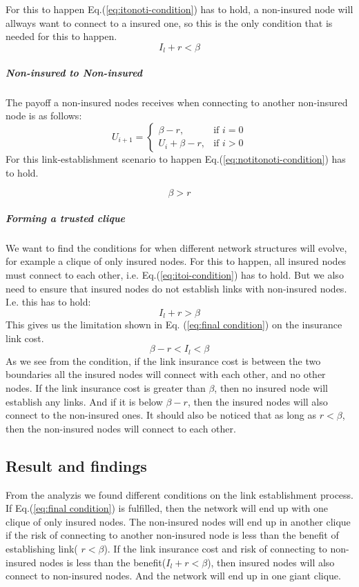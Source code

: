 For this to happen Eq.(\ref{eq:itonoti-condition}) has to hold, a non-insured node will allways want to connect to a insured one, so this is the only condition that is needed for this to happen.
\begin{equation}
I_{l}+r<\beta
\label{eq:itonoti-condition}
\end{equation}
\subparagraph{Non-insured to Non-insured}
The payoff a non-insured nodes receives when connecting to another non-insured node is as follows:
\begin{equation}
    U_{i+1}= 
\begin{cases}
    \beta -r,& \text{if } i = 0\\
    U_{i}+\beta -r,& \text{if }  i>0
   
\end{cases}
\label{eq:notitonotimodel2}
\end{equation}
For this link-establishment scenario to happen Eq.(\ref{eq:notitonoti-condition}) has to hold.

\begin{equation}
\beta>r
\label{eq:notitonoti-condition}
\end{equation}

\subparagraph{Forming a trusted clique}
We want to find the conditions for when different network structures will evolve, for example a clique of only insured nodes. For this to happen, all insured nodes must connect to each other, i.e. Eq.(\ref{eq:itoi-condition}) has to hold. But we also need to ensure that insured nodes do not establish links with non-insured nodes. I.e. this has to hold:
\begin{equation}
I_{l}+r>\beta
\end{equation}
This gives us the limitation shown in Eq. (\ref{eq:final condition}) on the insurance link cost.
\begin{equation}
\beta-r<I_{l}<\beta
\label{eq:final condition}
\end{equation}
As we see from the condition, if the link insurance cost is between the two boundaries all the insured nodes will connect with each other, and no other nodes. If the link insurance cost is greater than $\beta$, then no insured node will establish any links. And if it is below $\beta-r$, then the insured nodes will also connect to the non-insured ones.
It should also be noticed that as long as $r<\beta$, then the non-insured nodes will connect to each other. 

\subsection{Result and findings}
From the analyzis we found different conditions on the link establishment process. If Eq.(\ref{eq:final condition}) is fulfilled, then the network will end up with one clique of only insured nodes. The non-insured nodes will end up in another clique if the risk of connecting to another non-insured node is less than the benefit of establishing link( $r<\beta$).
If the link insurance cost and risk of connecting to non-insured nodes is less than the benefit($I_{l}+r<\beta$), then insured nodes will also connect to non-insured nodes. And the network will end up in one giant clique.


